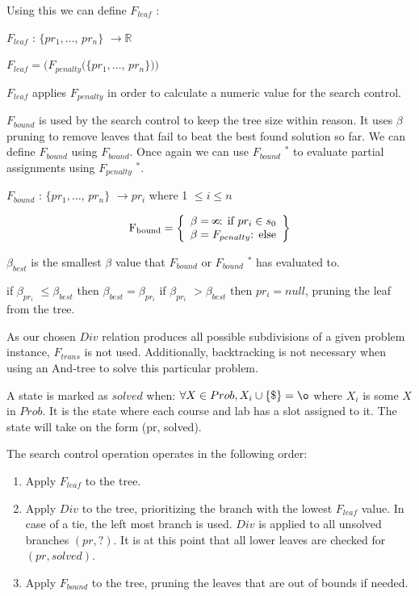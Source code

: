 \documentclass[11pt, oneside]{article}   	%
\def\infinity{\rotatebox{90}{8}}
\begin{document}
\noindent Using this we can define $F_{leaf}$ : 

\noindent $F_{leaf}$ : $\{pr_1, \dots$, $pr_n \} $  $ \to \mathbb{R} $  

\noindent $F_{leaf} = (F_{penalty}(\{pr_1, \dots$, $pr_n \}))$

\noindent $F_{leaf}$ applies $F_{penalty}$ in order to calculate a numeric value for the search control.

\noindent $F_{bound}$ is used by the search control to keep the tree size within reason. It uses $\beta$ pruning to remove leaves that fail to beat the best found solution so far.
We can define $F_{bound}$ using $F_{bound}$. Once again we can use $F_{bound}$ $^*$ to evaluate partial assignments using $F_{penalty}$ $^*$.

\noindent $F_{bound}$ : $\{pr_1, \dots$, $pr_n \} $  $ \to pr_i $    where 1 $\leq i\leq n$

 \[
          \text{F\textsubscript{bound}} = \left\{\begin{array}{ll}
            \beta = \infinity $: if $pr_i \in s_0 \\
           \beta = F_{penalty} $: else$\\
            
            \end{array}\right\}
      \]

\noindent $\beta _{best}$ is the smallest $\beta$ value that $F_{bound}$ or  $F_{bound}$ $^*$ has evaluated to.

\noindent if $\beta _{pr_i}$ $\leq \beta _{best}$ then $\beta_ {best} = \beta _{pr_i } $
\noindent if $\beta _{pr_i}$  $> \beta _{best}$ then  $pr_i = null$, pruning the leaf from the tree.

\noindent As our chosen $Div$ relation produces all possible subdivisions of a given problem instance, $F_{trans}$ is not used. Additionally, backtracking is not necessary when using an And-tree to solve this particular problem.

\noindent A state is marked as $solved$ when: $\forall X \in Prob, X_i \cup \{ \$ \} = \o $ where $X_i$ is some $X$ in $Prob$. It is the state where each course and lab has a slot assigned to it. The state will take on the form (pr, solved).

\noindent The search control operation operates in the following order:
\begin{enumerate}
\item Apply $F_{leaf}$ to the tree.
\item Apply $Div$ to the tree, prioritizing the branch with the lowest $F_{leaf}$ value. In case of a tie, the left most branch is used. $Div$ is applied to all unsolved branches $(pr, ?)$. It is at this point that all lower leaves are checked for $(pr, solved)$.
\item Apply $F_{bound}$ to the tree, pruning the leaves that are out of bounds if needed.
\end{enumerate}
\end{document}
